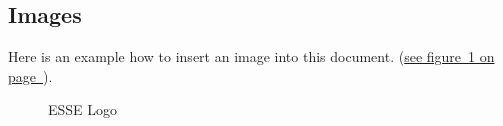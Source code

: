 \documentclass[12pt,a4paper,titlepage,oneside]{scrartcl}
\begin{document}
\subsection{Images}

Here is an example how to insert an image into this document.
(\hyperref[fig:logo1]{see figure~\ref*{fig:logo1} on page~\pageref*{fig:logo1}}).

\begin{figure}[h!]
  \centering
  \caption{ESSE Logo}
  \label{fig:logo1}
\end{figure}


%
%
\end{document}
